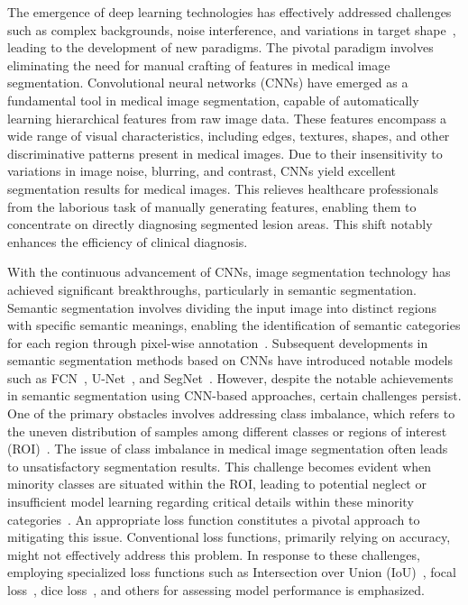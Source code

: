 \documentclass[review]{elsarticle}
\begin{document}
	The emergence of deep learning technologies has effectively addressed challenges such as complex backgrounds, noise interference, and variations in target shape~\cite{xie2021cotr,bao2018multi}, leading to the development of new paradigms. The pivotal paradigm involves eliminating the need for manual crafting of features in medical image segmentation. Convolutional neural networks (CNNs) have emerged as a fundamental tool in medical image segmentation, capable of automatically learning hierarchical features from raw image data. These features encompass a wide range of visual characteristics, including edges, textures, shapes, and other discriminative patterns present in medical images. Due to their insensitivity to variations in image noise, blurring, and contrast, CNNs yield excellent segmentation results for medical images. This relieves healthcare professionals from the laborious task of manually generating features, enabling them to concentrate on directly diagnosing segmented lesion areas. This shift notably enhances the efficiency of clinical diagnosis.

	With the continuous advancement of CNNs, image segmentation technology has achieved significant breakthroughs, particularly in semantic segmentation. Semantic segmentation involves dividing the input image into distinct regions with specific semantic meanings, enabling the identification of semantic categories for each region through pixel-wise annotation~\cite{LATEEF2019321}. Subsequent developments in semantic segmentation methods based on CNNs have introduced notable models such as FCN~\cite{long2015fully}, U-Net~\cite{ronneberger2015u}, and SegNet~\cite{badrinarayanan2017segnet}. However, despite the notable achievements in semantic segmentation using CNN-based approaches, certain challenges persist. One of the primary obstacles involves addressing class imbalance, which refers to the uneven distribution of samples among different classes or regions of interest (ROI)~\cite{japkowicz2002class}. The issue of class imbalance in medical image segmentation often leads to unsatisfactory segmentation results. This challenge becomes evident when minority classes are situated within the ROI, leading to potential neglect or insufficient model learning regarding critical details within these minority categories~\cite{yeung2022unified}. An appropriate loss function constitutes a pivotal approach to mitigating this issue. Conventional loss functions, primarily relying on accuracy, might not effectively address this problem. In response to these challenges, employing specialized loss functions such as Intersection over Union (IoU)~\cite{rezatofighi2019generalized}, focal loss~\cite{lin2017focal}, dice loss~\cite{zhao2020rethinking}, and others for assessing model performance is emphasized.
\end{document}
